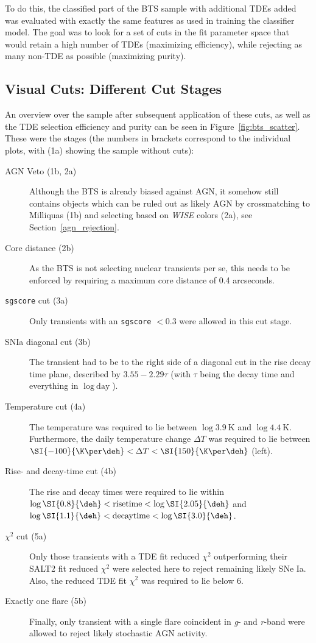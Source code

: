 To do this, the classified part of the BTS sample with additional TDEs added was evaluated with exactly the same features as used in training the classifier model. The goal was to look for a set of cuts in the fit parameter space that would retain a high number of TDEs (maximizing efficiency), while rejecting as many non-TDE as possible (maximizing purity).

\subsection{Visual Cuts: Different Cut Stages}
An overview over the sample after subsequent application of these cuts, as well as the TDE selection efficiency and purity can be seen in Figure~\ref{fig:bts_scatter}. These were the stages (the numbers in brackets correspond to the individual plots, with (1a) showing the sample without cuts):

\begin{description}
    \item[AGN Veto (1b, 2a)] Although the BTS is already biased against AGN, it somehow still contains objects which can be ruled out as likely AGN by crossmatching to Milliquas (1b) and selecting based on \textit{WISE} colors (2a), see Section~\ref{agn_rejection}.
    \item[Core distance (2b)] As the BTS is not selecting nuclear transients per se, this needs to be enforced by requiring a maximum core distance of 0.4 arcseconds.
    \item[\texttt{sgscore} cut (3a)] Only transients with an \texttt{sgscore} $<0.3$ were allowed in this cut stage.
    \item[SNIa diagonal cut (3b)] The transient had to be to the right side of a diagonal cut in the rise decay time plane, described by $3.55 - 2.29 \tau$ (with $\tau$ being the decay time and everything in $\log~\text{day}$).
    \item[Temperature cut (4a)] The temperature was required to lie between $\log \SI{3.9}{\K}$ and $\log\SI{4.4}{\K}$. Furthermore, the daily temperature change $\Delta T$ was required to lie between $\SI{-100}{\K\per\deh} < \Delta T < \SI{150}{\K\per\deh}$ (left).
    \item[Rise- and decay-time cut (4b)] The rise and decay times were required to lie within $\log \SI{0.8}{\deh} < \text{risetime} < \log \SI{2.05}{\deh}$ and $\log \SI{1.1}{\deh} < \text{decaytime} < \log \SI{3.0}{\deh}$.
    \item[$\chi^2$ cut (5a)] Only those transients with a TDE fit reduced $\chi^2$ outperforming their SALT2 fit reduced $\chi^2$ were selected here to reject remaining likely SNe Ia. Also, the reduced TDE fit $\chi^2$ was required to lie below 6.
    \item[Exactly one flare (5b)] Finally, only transient with a single flare coincident in \textit{g}- and \textit{r}-band were allowed to reject likely stochastic AGN activity.
\end{description}

